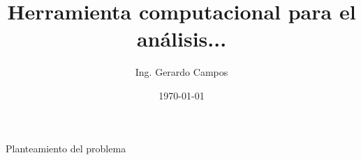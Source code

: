\documentclass{beamer}
\title[Trabajo de grado]{Herramienta computacional para el análisis...    }
\author[Ing. Campos]{Ing. Gerardo Campos}
\institute[UNEXPO]{Universidad Nacional Experimental Politécnica “Antonio José
de Sucre”}
\date{\today}
\begin{document}
\begin{frame}
    \titlepage
\end{frame}

\begin{frame}
   \huge
    Planteamiento del problema
\end{frame}




\end{document}
